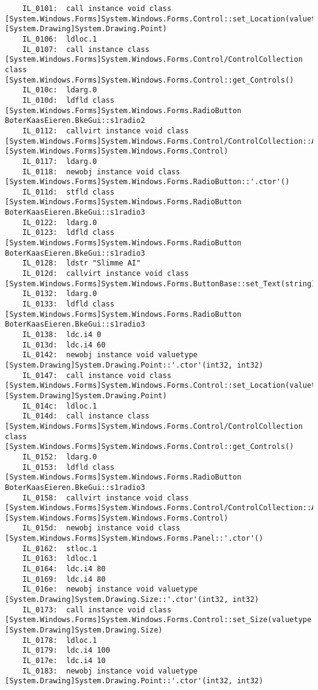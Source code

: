 \begin{lstlisting}
	IL_0101:  call instance void class [System.Windows.Forms]System.Windows.Forms.Control::set_Location(valuetype [System.Drawing]System.Drawing.Point)
	IL_0106:  ldloc.1 
	IL_0107:  call instance class [System.Windows.Forms]System.Windows.Forms.Control/ControlCollection class [System.Windows.Forms]System.Windows.Forms.Control::get_Controls()
	IL_010c:  ldarg.0 
	IL_010d:  ldfld class [System.Windows.Forms]System.Windows.Forms.RadioButton BoterKaasEieren.BkeGui::s1radio2
	IL_0112:  callvirt instance void class [System.Windows.Forms]System.Windows.Forms.Control/ControlCollection::Add(class [System.Windows.Forms]System.Windows.Forms.Control)
	IL_0117:  ldarg.0 
	IL_0118:  newobj instance void class [System.Windows.Forms]System.Windows.Forms.RadioButton::'.ctor'()
	IL_011d:  stfld class [System.Windows.Forms]System.Windows.Forms.RadioButton BoterKaasEieren.BkeGui::s1radio3
	IL_0122:  ldarg.0 
	IL_0123:  ldfld class [System.Windows.Forms]System.Windows.Forms.RadioButton BoterKaasEieren.BkeGui::s1radio3
	IL_0128:  ldstr "Slimme AI"
	IL_012d:  callvirt instance void class [System.Windows.Forms]System.Windows.Forms.ButtonBase::set_Text(string)
	IL_0132:  ldarg.0 
	IL_0133:  ldfld class [System.Windows.Forms]System.Windows.Forms.RadioButton BoterKaasEieren.BkeGui::s1radio3
	IL_0138:  ldc.i4 0
	IL_013d:  ldc.i4 60
	IL_0142:  newobj instance void valuetype [System.Drawing]System.Drawing.Point::'.ctor'(int32, int32)
	IL_0147:  call instance void class [System.Windows.Forms]System.Windows.Forms.Control::set_Location(valuetype [System.Drawing]System.Drawing.Point)
	IL_014c:  ldloc.1 
	IL_014d:  call instance class [System.Windows.Forms]System.Windows.Forms.Control/ControlCollection class [System.Windows.Forms]System.Windows.Forms.Control::get_Controls()
	IL_0152:  ldarg.0 
	IL_0153:  ldfld class [System.Windows.Forms]System.Windows.Forms.RadioButton BoterKaasEieren.BkeGui::s1radio3
	IL_0158:  callvirt instance void class [System.Windows.Forms]System.Windows.Forms.Control/ControlCollection::Add(class [System.Windows.Forms]System.Windows.Forms.Control)
	IL_015d:  newobj instance void class [System.Windows.Forms]System.Windows.Forms.Panel::'.ctor'()
	IL_0162:  stloc.1 
	IL_0163:  ldloc.1 
	IL_0164:  ldc.i4 80
	IL_0169:  ldc.i4 80
	IL_016e:  newobj instance void valuetype [System.Drawing]System.Drawing.Size::'.ctor'(int32, int32)
	IL_0173:  call instance void class [System.Windows.Forms]System.Windows.Forms.Control::set_Size(valuetype [System.Drawing]System.Drawing.Size)
	IL_0178:  ldloc.1 
	IL_0179:  ldc.i4 100
	IL_017e:  ldc.i4 10
	IL_0183:  newobj instance void valuetype [System.Drawing]System.Drawing.Point::'.ctor'(int32, int32)

\end{lstlisting}
